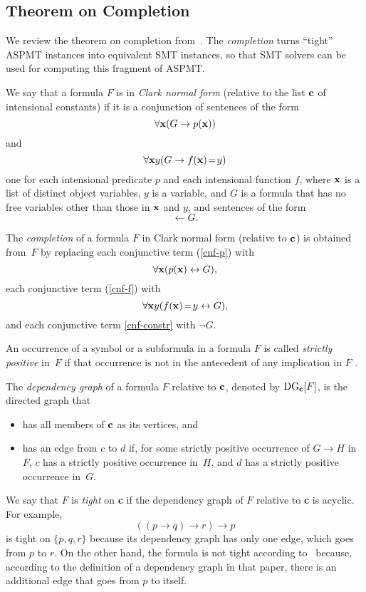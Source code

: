 \documentclass[runningheads]{llncs}
\def\ar{\leftarrow}
\def\beq{\begin{equation}}
\def\eeq#1{\label{#1}\end{equation}}
\def\ar{\leftarrow}
\def\rar{\rightarrow}
\def\lrar{\leftrightarrow}
\def\dg{\hbox{\rm DG}}
\def\bC{{\bf{c}}}
\def\mvis{\!=\!}
\newcommand{\cblu}{\color{blue}}
\newcommand{\cbla}{\color{black}}
\begin{document}
\subsection{Theorem on Completion}\label{ssec:comp}

We review the theorem on completion from~\cite{bartholomew13functional}.
The {\em completion} turns  ``tight'' ASPMT instances into 
equivalent SMT instances, so that SMT solvers can be used for
computing this fragment of ASPMT. 

We say that a formula $F$ is in {\em Clark normal form} (relative to
the list ${\bf c}$ of intensional constants) if it is a conjunction of
sentences of the form %
\beq
   \forall {\bf x} (G\rar p({\bf x}))
\eeq{cnf-p}
and 
\beq
\forall {\bf x}y (G \rar f({\bf x}) \mvis y)
\eeq{cnf-f}
one for each intensional predicate $p$ and each intensional function
$f$, where ${\bf x}$ is a list of distinct object variables, $y$ is
a variable, and $G$ is a formula that has no free variables other than
those in ${\bf x}$ and $y$, and sentences of the form
\beq
  \ar G.
\eeq{cnf-constr}

The {\em completion} of a formula $F$ in Clark normal form (relative
to ${\bf c}$) is obtained from~$F$ by replacing each conjunctive term
(\ref{cnf-p}) with
\beq
  \forall {\bf x} (p({\bf x})\lrar G),
\eeq{comp-p}
each conjunctive term (\ref{cnf-f}) with 
\beq
  \forall {\bf x}y (f({\bf x})\mvis y\lrar G),
\eeq{comp-f}
and each conjunctive term \eqref{cnf-constr} with $\neg G$.

An occurrence of a symbol or a subformula in a formula $F$ is called
{\em strictly positive} in~$F$ if that occurrence is not in the
antecedent of any implication in $F$ .

The {\em dependency graph} of a formula $F$ relative to ${\bf c}$,
denoted by $\dg_\bC[F]$, is the directed graph that 
\begin{itemize}
\item  has all members of ${\bf c}$ as its vertices, and
\item  has an edge from $c$ to $d$ if, for some strictly positive
  occurrence of $G\rar H$ in $F$, $c$ has a strictly positive
  occurrence in~$H$, and $d$ has a strictly positive occurrence in~$G$. 
\end{itemize}
%
We say that $F$ is {\em tight} on {\bf c} if the dependency graph of
$F$ relative to {\bf c} is acyclic. 
\BOCC
\cblu
For example, 
\[
   ((p\rar q)\rar r)\rar p
\]
is tight on $\{p,q,r\}$ because its dependency graph has only one
edge, which goes from $p$ to $r$. On the other hand, the formula is
not tight according to~\cite{ferraris11stable} because, according to
the definition of a dependency graph in that paper, there is an 
additional edge that goes from $p$ to itself. 
\cbla
\EOCC
\end{document}
